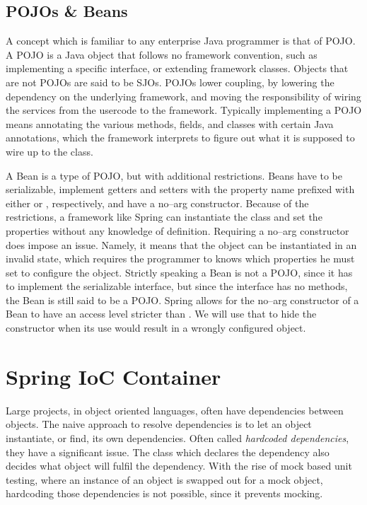 \subsection{POJOs \& Beans}\label{beans}
A concept which is familiar to any enterprise Java programmer is that of \ac{POJO}.
A \ac{POJO} is a Java object that follows no framework convention, such as implementing a specific interface, or extending framework classes.
Objects that are not \acp{POJO} are said to be \acp{SJO}.
\acp{POJO} lower coupling, by lowering the dependency on the underlying framework, and moving the responsibility of wiring the services from the usercode to the framework.
Typically implementing a \ac{POJO} means annotating the various methods, fields, and classes with certain Java annotations, which the framework interprets to figure out what it is supposed to wire up to the class.\cite{spring_pojo}

A Bean is a type of \ac{POJO}, but with additional restrictions.
Beans have to be serializable, implement getters and setters with the property name prefixed with either  or , respectively, and have a no--arg constructor.
Because of the restrictions, a framework like Spring can instantiate the class and set the properties without any knowledge of definition.
Requiring a no--arg constructor does impose an issue.
Namely, it means that the object can be instantiated in an invalid state, which requires the programmer to knows which properties he must set to configure the object.
Strictly speaking a Bean is not a \ac{POJO}, since it has to implement the serializable interface, but since the interface has no methods, the Bean is still said to be a \ac{POJO}.
Spring allows for the no--arg constructor of a Bean to have an access level stricter than .
We will use that to hide the constructor when its use would result in a wrongly configured object.

\section{Spring IoC Container}\label{ioc_container}
Large projects, in object oriented languages, often have dependencies between objects.
The naive approach to resolve dependencies is to let an object instantiate, or find, its own dependencies.
Often called \textit{hardcoded dependencies}, they have a significant issue.
The class which declares the dependency also decides what object will fulfil the dependency.
With the rise of mock based unit testing, where an instance of an object is swapped out for a mock object, hardcoding those dependencies is not possible, since it prevents mocking.

